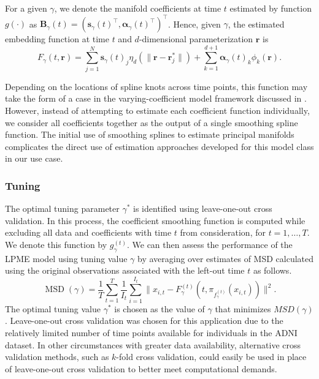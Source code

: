 \documentclass[12pt]{article}
\newcommand{\T}{\intercal}
\theoremstyle{definition}
\begin{document}
For a given $\gamma$, we denote the manifold coefficients at time $t$ estimated by function $g(\cdot)$ as $\mathbf{B}_{\gamma}(t) = \left(\mathbf{s}_{\gamma}(t)^\T, \mathbf{\alpha}_{\gamma}(t)^\T\right)^\T$. Hence, given $\gamma$, the estimated embedding function at time $t$ and $d$-dimensional parameterization $\mathbf{r}$ is
\begin{equation}
  F_{\gamma}(t, \mathbf{r}) = \sum_{j=1}^{N}\mathbf{s}_{\gamma}(t)_j \eta_{d}\left(\|\mathbf{r} - \mathbf{r}_j^*\|\right) + \sum_{k=1}^{d+1}\mathbf{\alpha}_{\gamma}(t)_k \phi_k(\mathbf{r}). \label{eq:17}
\end{equation}

Depending on the locations of spline knots  across time points, this function may take the form of a case in the varying-coefficient model framework discussed in \cite{hastieVaryingCoefficientModels1993}. However, instead of attempting to estimate each coefficient function individually, we consider all coefficients together as the output of a single smoothing spline function. The initial use of smoothing splines to estimate principal manifolds complicates the direct use of estimation approaches developed for this model class in our use case.

\subsubsection{Tuning}

The optimal tuning parameter $\gamma^*$ is identified using leave-one-out cross validation. In this process, the coefficient smoothing function is computed while excluding all data and coefficients with time $t$ from consideration, for $t = 1, \dots, T$. We denote this function by $g_{\gamma}^{(t)}$. We can then assess the performance of the LPME model using tuning value $\gamma$ by averaging over estimates of MSD calculated using the original observations associated with the left-out time $t$ as follows.
\begin{equation}
  \operatorname{MSD}(\gamma) = \frac{1}{T} \sum_{t=1}^{T}\frac{1}{I_t}\sum_{i=1}^{I_t}\|x_{i, t} - F_{\gamma}^{(t)}(t, \pi_{f_{\gamma}^{(t)}}(x_{i, t}))\|^2. \label{eq:18}
\end{equation}
The optimal tuning value $\gamma^*$ is chosen as the value of $\gamma$ that minimizes $MSD(\gamma)$. Leave-one-out cross validation was chosen for this application due to the relatively limited number of time points available for individuals in the ADNI dataset. In other circumstances with greater data availability, alternative cross validation methods, such as $k$-fold cross validation, could easily be used in place of leave-one-out cross validation to better meet computational demands.
\end{document}
